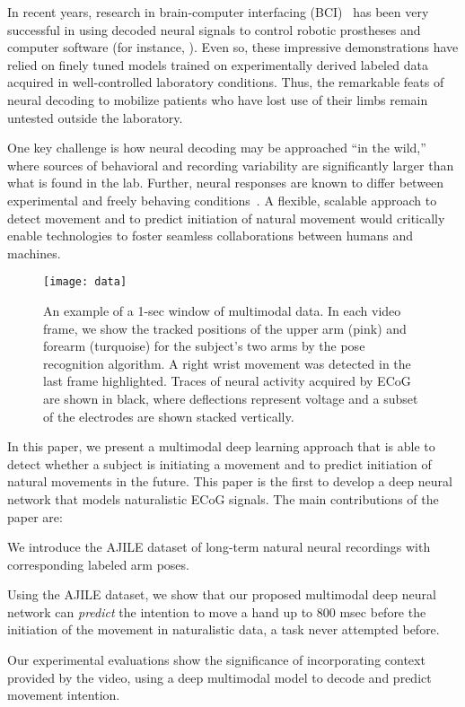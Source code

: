 \documentclass[letterpaper]{article} %
\begin{document}
In recent years, research in brain-computer interfacing (BCI)~\cite{Wolpaw2012,rao2013} has been very successful in using decoded neural signals to control robotic prostheses and computer software (for instance, \cite{hochberg2012,McMullen2014,Yanagisawa2011}).
Even so, these impressive demonstrations have relied on finely tuned models trained on experimentally derived labeled data acquired in well-controlled laboratory conditions.
Thus, the remarkable feats of neural decoding to mobilize patients who have lost use of their limbs remain untested outside the laboratory. %

One key challenge is how neural decoding may be approached ``in the wild,'' where sources of behavioral and recording variability are significantly larger than what is found in the lab.
Further, neural responses are known to differ between experimental and freely behaving conditions~\cite{Jackson2007}.
A flexible, scalable approach to detect movement and to predict initiation of natural movement would critically enable technologies to foster seamless collaborations between humans and machines.

\begin{figure*}[t]
\texttt{[image: data]} %
\caption{An example of a 1-sec window of multimodal data. 
In each video frame, we show the tracked positions of the upper arm (pink) and forearm (turquoise) for the subject's two arms by the pose recognition algorithm. A right wrist movement was detected in the last frame highlighted. Traces of neural activity acquired by ECoG are shown in black, where deflections represent voltage and a subset of the electrodes are shown stacked vertically.}
\label{fig:samples}
\end{figure*}


In this paper, we present a multimodal deep learning approach that is able to detect whether a subject is initiating a movement and to predict initiation of natural movements in the future.
This paper is the first to develop a deep neural network that models naturalistic ECoG signals. 
The main contributions of the paper are:


\begin{compactitem}
\item We introduce the AJILE dataset of long-term natural neural recordings with corresponding labeled arm poses.

\item Using the AJILE dataset, we show that our proposed multimodal deep neural network can \emph{predict} the intention to move a hand up to 800 msec before the initiation of the movement in naturalistic data, a task never attempted before.


\item Our experimental evaluations show the significance of incorporating context provided by the video, using a deep multimodal model to decode and predict movement intention. 





\end{compactitem}
\end{document}
